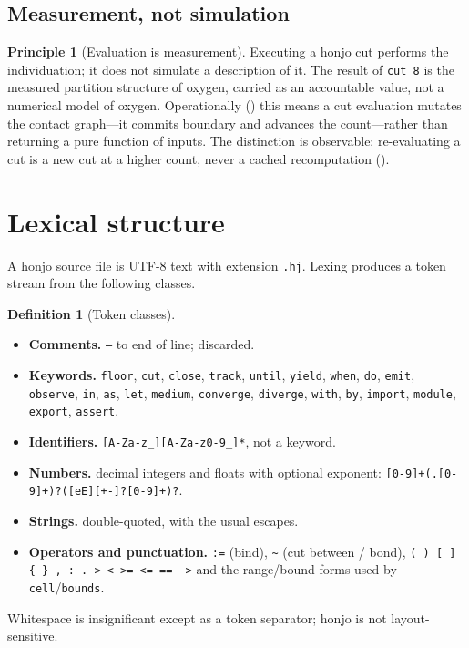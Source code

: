 \documentclass[11pt,a4paper]{article}
\theoremstyle{thmstyle}
\theoremstyle{definition}
\newtheorem{definition}[theorem]{Definition}
\newtheorem{principle}[theorem]{Principle}
\theoremstyle{remark}
\newcommand{\hj}[1]{\texttt{#1}}
\begin{document}
\subsection{Measurement, not simulation}

\begin{principle}[Evaluation is measurement]
\label{prin:measure}
Executing a honjo cut performs the individuation; it does not simulate a
description of it. The result of \hj{cut\ 8} is the measured partition
structure of oxygen, carried as an accountable value, not a numerical
model of oxygen. Operationally () this means a cut
evaluation mutates the contact graph---it commits boundary and advances
the count---rather than returning a pure function of inputs. The
distinction is observable: re-evaluating a cut is a new cut at a higher
count, never a cached recomputation ().
\end{principle}

\section{Lexical structure}
\label{sec:lexical}

A honjo source file is UTF-8 text with extension \hj{.hj}. Lexing
produces a token stream from the following classes.

\begin{definition}[Token classes]
\label{def:tokens}
\leavevmode
\begin{itemize}[leftmargin=1.4em,itemsep=1pt]
\item \textbf{Comments.} \hj{--} to end of line; discarded.
\item \textbf{Keywords.} \hj{floor}, \hj{cut}, \hj{close}, \hj{track},
\hj{until}, \hj{yield}, \hj{when}, \hj{do}, \hj{emit}, \hj{observe},
\hj{in}, \hj{as}, \hj{let}, \hj{medium}, \hj{converge}, \hj{diverge},
\hj{with}, \hj{by}, \hj{import}, \hj{module}, \hj{export}, \hj{assert}.
\item \textbf{Identifiers.} \hj{[A-Za-z\_][A-Za-z0-9\_]*}, not a keyword.
\item \textbf{Numbers.} decimal integers and floats with optional
exponent: \hj{[0-9]+(.[0-9]+)?([eE][+-]?[0-9]+)?}.
\item \textbf{Strings.} double-quoted, with the usual escapes.
\item \textbf{Operators and punctuation.} \hj{:=} (bind), \hj{\~{}} (cut
between / bond), \hj{( ) [ ] \{ \} , : . > < >= <= == ->} and the
range/bound forms used by \hj{cell}/\hj{bounds}.
\end{itemize}
Whitespace is insignificant except as a token separator; honjo is not
layout-sensitive.
\end{definition}
\end{document}
